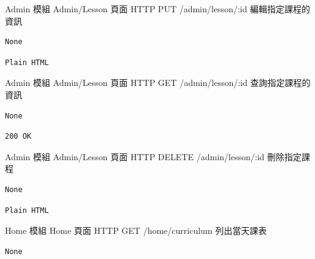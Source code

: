 \documentclass{article}
\begin{document}
{Admin 模組}
{Admin/Lesson 頁面}
{HTTP PUT}
{/admin/lesson/:id}
{編輯指定課程的資訊}

\bigskip

\begin{lrbox}{\jsoninputbox}
	\begin{lstlisting}
None
\end{lstlisting}
\end{lrbox}

\begin{lrbox}{\jsonoutputbox}
	\begin{lstlisting}
Plain HTML
\end{lstlisting}
\end{lrbox}

{Admin 模組}
{Admin/Lesson 頁面}
{HTTP GET}
{/admin/lesson/:id}
{查詢指定課程的資訊}

\bigskip

\begin{lrbox}{\jsoninputbox}
	\begin{lstlisting}
None
\end{lstlisting}
\end{lrbox}

\begin{lrbox}{\jsonoutputbox}
	\begin{lstlisting}
200 OK
\end{lstlisting}
\end{lrbox}

{Admin 模組}
{Admin/Lesson 頁面}
{HTTP DELETE}
{/admin/lesson/:id}
{刪除指定課程}

\bigskip

\begin{lrbox}{\jsoninputbox}
	\begin{lstlisting}
None
\end{lstlisting}
\end{lrbox}

\begin{lrbox}{\jsonoutputbox}
	\begin{lstlisting}
Plain HTML
\end{lstlisting}
\end{lrbox}

{Home 模組}
{Home 頁面}
{HTTP GET}
{/home/curriculum}
{列出當天課表}

\bigskip

\begin{lrbox}{\jsoninputbox}
	\begin{lstlisting}
None
\end{lstlisting}
\end{lrbox}
\end{document}
